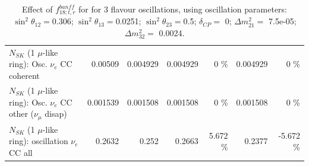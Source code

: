\begin{table}
\begin{tabular}{| l | r | r | r  r | r  r |}
                          $N_{SK}$ (1 $\mu$-like ring): Osc. $\nu_e$ CC coherent &         0.00509 &        0.004929 &        0.004929 &        0 \%  &        0.004929 &        0 \%  \\ 
           $N_{SK}$ (1 $\mu$-like ring): Osc. $\nu_e$ CC other ($\nu_\mu$ disap) &        0.001539 &        0.001508 &        0.001508 &        0 \%  &        0.001508 &        0 \%  \\ 
                        $N_{SK}$ (1 $\mu$-like ring): oscillation $\nu_e$ CC all &          0.2632 &           0.252 &          0.2663 &    5.672 \%  &          0.2377 &   -5.672 \%  \\ 
\hline
\hline
\end{tabular}
\caption{ Effect of $f_{18; t, r}^{banff}$ for for 3 flavour oscillations, using oscillation parameters:  $\sin^2\theta_{12} = $0.306; $\sin^2\theta_{13} = $0.0251; $\sin^2\theta_{23} = $0.5; $\delta_{CP} = $        0; $\Delta m^2_{21} = $    7.5e-05; $\Delta m^2_{32} = $    0.0024. }
\label{tab:num_banff_ccqeE0_1RmuT_3f_osc_t13:0.0251}
\end{table}
\clearpage
